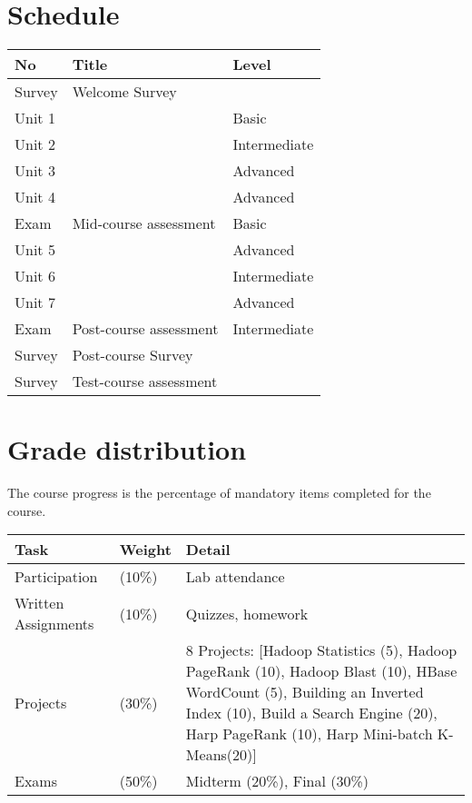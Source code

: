 \FILENAME

\section{Schedule}
\begin{center}
  \begin{tabular}{|l|l|l|}
    \hline
    No & Title & Level \\
    \hline
    Survey 
    &          Welcome Survey
    &          ~ \\
    \hline
    Unit 1 & \nameref{sec:icloud-fundamentals} & Basic \\
    \hline 
    Unit 2 & \nameref{sec:icloud-iaas} & Intermediate \\
    \hline
    Unit 3 & \nameref{sec:icloud-mapreduce} & Advanced \\
    \hline
    Unit 4 & \nameref{sec:icloud-iterative-mapreduce} & Advanced \\
    \hline
    Exam & Mid-course assessment & Basic \\
    \hline
    Unit 5 & \nameref{sec:icloud-nosql} & Advanced \\
    \hline
    Unit 6 & \nameref{sec:icloud-iot}  & Intermediate \\
    \hline
    Unit 7 & \nameref{sec:icloud-saas} & Advanced \\
    \hline
    Exam & Post-course assessment & Intermediate \\
    \hline
    Survey & Post-course Survey  & ~ \\
    \hline
    Survey & Test-course assessment & ~ \\
    \hline
  \end{tabular}
\end{center}

\section{Grade distribution}
The course progress is the percentage of mandatory items completed for the course.

\begin{center}
  \begin{tabular}{|l|l|p{5cm}|}
    \hline
    Task & Weight & Detail \\
    \hline
    Participation & (10\%) & Lab attendance \\
    \hline
    Written Assignments & (10\%) & Quizzes, homework \\
    \hline
    Projects & (30\%) & 8 Projects: [Hadoop Statistics (5), Hadoop PageRank (10), Hadoop Blast (10), HBase WordCount (5), Building an Inverted Index (10), Build a Search Engine (20), Harp PageRank (10), Harp Mini-batch K-Means(20)] \\
    \hline
    Exams & (50\%) & Midterm (20\%), Final (30\%)  \\
    \hline
  \end{tabular}
\end{center}

